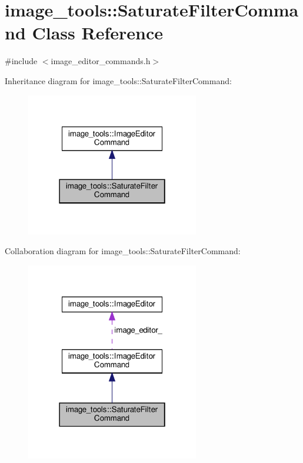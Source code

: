 \hypertarget{classimage__tools_1_1SaturateFilterCommand}{}\section{image\+\_\+tools\+:\+:Saturate\+Filter\+Command Class Reference}
\label{classimage__tools_1_1SaturateFilterCommand}


{\ttfamily \#include $<$image\+\_\+editor\+\_\+commands.\+h$>$}



Inheritance diagram for image\+\_\+tools\+:\+:Saturate\+Filter\+Command\+:
\nopagebreak
\begin{figure}[H]
\begin{center}
\leavevmode
\includegraphics[width=214pt]{classimage__tools_1_1SaturateFilterCommand__inherit__graph}
\end{center}
\end{figure}


Collaboration diagram for image\+\_\+tools\+:\+:Saturate\+Filter\+Command\+:
\nopagebreak
\begin{figure}[H]
\begin{center}
\leavevmode
\includegraphics[width=214pt]{classimage__tools_1_1SaturateFilterCommand__coll__graph}
\end{center}
\end{figure}
